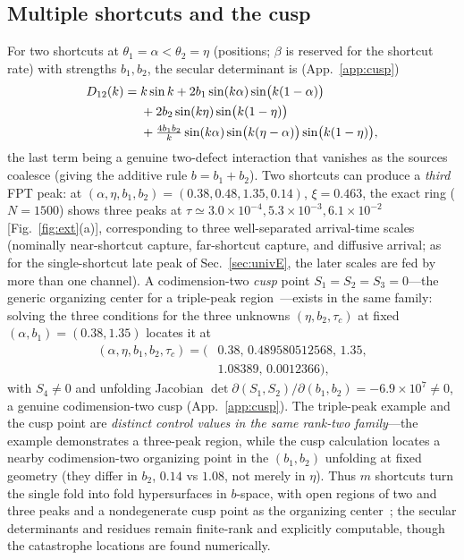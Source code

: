 \documentclass[reprint,amsmath,amssymb,aps,prresearch,longbibliography]{revtex4-2}
\begin{document}
\subsection{Multiple shortcuts and the cusp}\label{sec:univB}
For two shortcuts at $\theta_1=\alpha<\theta_2=\eta$ (positions; $\beta$ is reserved for the shortcut
rate) with strengths $b_1,b_2$, the secular determinant is (App.~\ref{app:cusp})
\begin{align}
D_{12}(k)={}&k\sin k+2b_1\sin(k\alpha)\sin\!\big(k(1-\alpha)\big)\notag\\
&+2b_2\sin(k\eta)\sin\!\big(k(1-\eta)\big)\notag\\
&+\tfrac{4b_1b_2}{k}\sin(k\alpha)\sin\!\big(k(\eta-\alpha)\big)\sin\!\big(k(1-\eta)\big),
\label{eq:D12}
\end{align}
the last term being a genuine two-defect interaction that vanishes as the sources coalesce (giving the
additive rule $b=b_1+b_2$). Two shortcuts can produce a \emph{third} FPT peak: at
$(\alpha,\eta,b_1,b_2)=(0.38,0.48,1.35,0.14)$, $\xi=0.463$, the exact ring ($N=1500$) shows three
peaks at $\tau\simeq3.0\times10^{-4},5.3\times10^{-3},6.1\times10^{-2}$ [Fig.~\ref{fig:ext}(a)],
corresponding to three well-separated arrival-time scales (nominally near-shortcut capture,
far-shortcut capture, and diffusive arrival; as for the single-shortcut late peak of
Sec.~\ref{sec:univE}, the later scales are fed by more than one channel).
A codimension-two \emph{cusp} point $S_1=S_2=S_3=0$---the generic organizing center for a triple-peak
region~\cite{Arnold1992}---exists in the same family: solving the three conditions for the three
unknowns $(\eta,b_2,\tau_c)$ at fixed $(\alpha,b_1)=(0.38,1.35)$ locates it at
\begin{equation}
\begin{split}
(\alpha,\eta,b_1,b_2,\tau_c)=(&0.38,\,0.489580512568,\,1.35,\\
&1.08389,\,0.0012366),
\end{split}
\label{eq:cusp}
\end{equation}
with $S_4\neq0$ and unfolding Jacobian $\det\partial(S_1,S_2)/\partial(b_1,b_2)=-6.9\times10^7\neq0$, a
genuine codimension-two cusp (App.~\ref{app:cusp}). The triple-peak example and the cusp point are
\emph{distinct control values in the same rank-two family}---the example demonstrates a three-peak
region, while the cusp calculation locates a nearby codimension-two organizing point in the
$(b_1,b_2)$ unfolding at fixed geometry (they differ in $b_2$, $0.14$ vs $1.08$, not merely in $\eta$).
Thus $m$ shortcuts turn the single fold into fold hypersurfaces in $b$-space, with open regions of two
and three peaks and a nondegenerate cusp point as the organizing center~\cite{Arnold1992}; the secular
determinants and residues remain
finite-rank and explicitly computable, though the catastrophe locations are found numerically.
\end{document}
